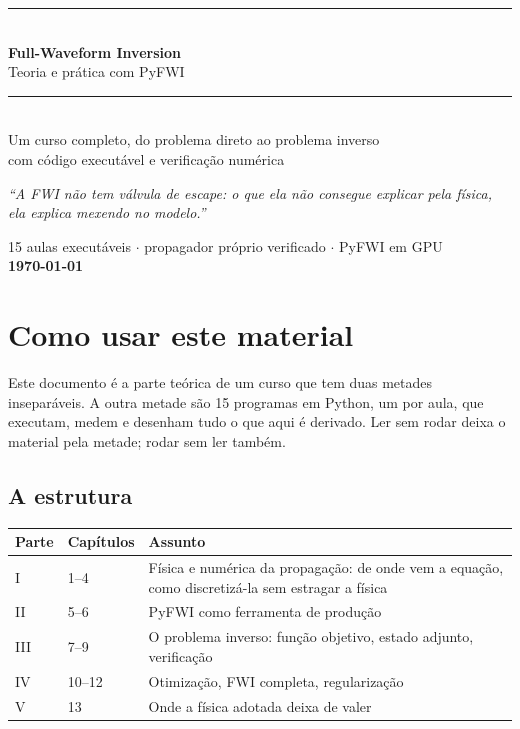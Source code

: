 \documentclass[11pt,a4paper,oneside]{report}
\begin{document}
\begin{titlepage}
\centering
\vspace*{2.2cm}
{\color{cianofwi}\rule{\textwidth}{2.2pt}}\\[0.5cm]
{\Huge\bfseries\color{azulfwi} Full-Waveform Inversion}\\[0.45cm]
{\LARGE\color{azulfwi} Teoria e prática com PyFWI}\\[0.4cm]
{\color{cianofwi}\rule{\textwidth}{2.2pt}}\\[1.6cm]

{\large Um curso completo, do problema direto ao problema inverso}\\[0.35cm]
{\large com código executável e verificação numérica}\\[2.4cm]

\begin{minipage}{0.82\textwidth}
\centering\itshape\large
``A FWI não tem válvula de escape: o que ela não consegue explicar
pela física, ela explica mexendo no modelo.''
\end{minipage}

\vfill
{\large 15 aulas executáveis $\cdot$ propagador próprio verificado $\cdot$ PyFWI em GPU}\\[0.7cm]
{\large\bfseries \today}
\end{titlepage}

\tableofcontents
\cleardoublepage

\chapter*{Como usar este material}

Este documento é a parte teórica de um curso que tem duas metades
inseparáveis. A outra metade são 15 programas em Python, um por aula, que
executam, medem e desenham tudo o que aqui é derivado. Ler sem rodar deixa o
material pela metade; rodar sem ler também.

\section*{A estrutura}

\begin{center}
\begin{tabular}{@{}llp{8.4cm}@{}}
\toprule
\textbf{Parte} & \textbf{Capítulos} & \textbf{Assunto} \\
\midrule
I   & 1--4   & Física e numérica da propagação: de onde vem a equação, como discretizá-la sem estragar a física \\
II  & 5--6   & PyFWI como ferramenta de produção \\
III & 7--9   & O problema inverso: função objetivo, estado adjunto, verificação \\
IV  & 10--12 & Otimização, FWI completa, regularização \\
V   & 13     & Onde a física adotada deixa de valer \\
\bottomrule
\end{tabular}
\end{center}
\end{document}
